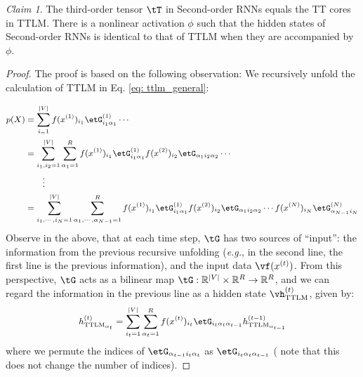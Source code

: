 \documentclass{article}
\theoremstyle{plain}
\theoremstyle{definition}
\theoremstyle{remark}
\newtheorem{claim}[theorem]{Claim}
\begin{document}
\begin{claim}
\label{cm: G and T}
The third-order tensor $\tT$ in Second-order RNNs equals the TT cores in TTLM. There is a nonlinear activation $\phi$ such that the hidden states of Second-order RNNs is identical to that of TTLM when they are accompanied by $\phi$.
\end{claim}

\begin{proof} The proof is based on the following observation: We recursively unfold the calculation of TTLM in Eq. \ref{eq: ttlm_general}: 

\begin{equation} \small
\begin{aligned}
\label{eq: TTLM_unfold}
p(X) &= \sum_{{i_ = 1}}^{|V|} f(x^{(1)})_{i_1}\etG^{(1)}_{i_1\alpha_{1}}  \cdots \\
&= \sum_{{i_1,i_2 = 1}}^{|V|} \sum_{\alpha_1 = 1}^R   f(x^{(1)})_{i_1}\etG^{(1)}_{i_1\alpha_{1}} f(x^{(2)})_{i_2} \etG_{\alpha_{1}i_2\alpha_{2}} \cdots  \\
&  \quad\quad\vdots \\
&= \sum_{i_1, \cdots, i_N = 1}^{|V|} 
    \sum_{\alpha_1, \cdots ,\alpha_{N-1} =1}^{R}  f(x^{(1)})_{i_1}\etG^{(1)}_{i_1\alpha_1}
    f(x^{(2)})_{i_2}\etG_{\alpha_1i_2\alpha_2} \cdots f(x^{(N)})_{i_N}\etG^{(N)}_{\alpha_{N-1}i_N}   \\
\end{aligned}
\end{equation}
%
Observe in the above, that at each time step,
$\tG$ has two sources of ``input'': the information from the previous recursive unfolding (\textit{e.g.}, in the second line, the first line is the previous information), and the input data $\vf(x^{(t)})$. 
From this perspective, $\tG$ acts as a bilinear map $\tG: \mathbb{R}^{|V|} \times \mathbb{R}^R \rightarrow \mathbb{R}^R $, and we can regard the information in the previous line as a hidden state $\vh^{(t)}_\text{TTLM}$, given by: 
%
\begin{equation} \small
\begin{split}
    \label{eq: ttlm cell}
    h^{(t)}_{\textrm{TTLM}_{\alpha_{t}}}
    & = \sum_{{i_t = 1}}^{|V|} \sum_{{\alpha_t = 1}}^{R} f(x^{(t)})_{i_t}\etG_{i_t\alpha_{t}\alpha_{t-1}}  h^{(t-1)}_{\textrm{TTLM}_{\alpha_{t-1}}} \\
\end{split}
\end{equation}
%
where we permute the indices  of  $\etG_{\alpha_{t-1}i_t\alpha_{t}}$ as $\etG_{i_t\alpha_{t}\alpha_{t-1}}$  ( note that this does not change the number of indices). 


\end{proof}
\end{document}
